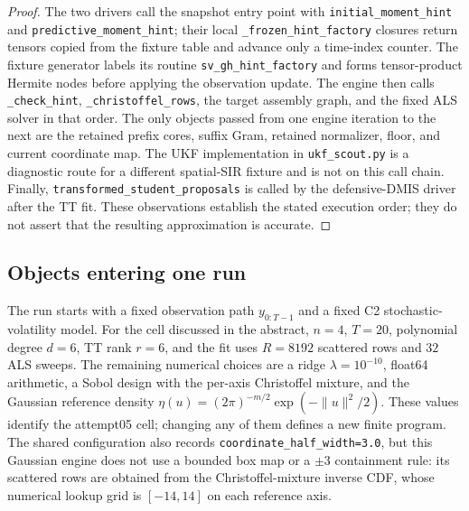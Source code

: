 \documentclass[11pt]{article}
\begin{document}
\begin{proof}
The two drivers call the snapshot entry point with
\texttt{initial\_moment\_hint} and \texttt{predictive\_moment\_hint}; their local
\texttt{\_frozen\_hint\_factory} closures return tensors copied from the fixture
table and advance only a time-index counter.  The fixture generator labels its
routine \texttt{sv\_gh\_hint\_factory} and forms tensor-product Hermite nodes
before applying the observation update.  The engine then calls
\texttt{\_check\_hint}, \texttt{\_christoffel\_rows}, the target assembly graph, and
the fixed ALS solver in that order.  The only objects passed from one engine
iteration to the next are the retained prefix cores, suffix Gram, retained
  normalizer, floor, and current coordinate map.  The UKF implementation in
\texttt{ukf\_scout.py} is a diagnostic route for a different
spatial-SIR fixture and is not on this call chain.  Finally,
\texttt{transformed\_student\_proposals} is called by the defensive-DMIS driver
after the TT fit.  These observations establish the stated execution order;
they do not assert that the resulting approximation is accurate.
\end{proof}

\subsection{Objects entering one run}

The run starts with a fixed observation path $y_{0:T-1}$ and a fixed C2
stochastic-volatility model.  For the cell discussed in the abstract,
$n=4$, $T=20$, polynomial degree $d=6$, TT rank $r=6$, and the fit uses
$R=8192$ scattered rows and $32$ ALS sweeps.  The remaining numerical choices
are a ridge $\lambda=10^{-10}$, float64 arithmetic, a Sobol design with the
per-axis Christoffel mixture, and the Gaussian reference density
$\eta(u)=(2\pi)^{-m/2}\exp(-\lVert u\rVert^2/2)$.  These values identify the
attempt05 cell; changing any of them defines a new finite program.
The shared configuration also records
\texttt{coordinate\_half\_width=3.0}, but this Gaussian engine does not use a
bounded box map or a $\pm3$ containment rule: its scattered rows are obtained
from the Christoffel-mixture inverse CDF, whose numerical lookup grid is
$[-14,14]$ on each reference axis.
\end{document}
